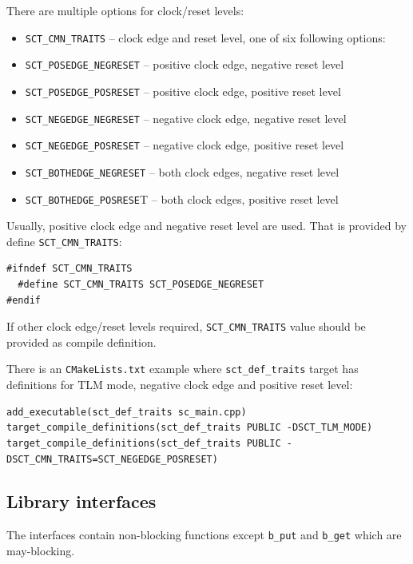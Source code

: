 There are multiple options for clock/reset levels:

\begin{itemize}
\item {\tt SCT\_CMN\_TRAITS} -- clock edge and reset level, one of six following options:
\item {\tt SCT\_POSEDGE\_NEGRESET} -- positive clock edge, negative reset level
\item {\tt SCT\_POSEDGE\_POSRESET} -- positive clock edge, positive reset level
\item {\tt SCT\_NEGEDGE\_NEGRESET} -- negative clock edge, negative reset level
\item {\tt SCT\_NEGEDGE\_POSRESET} -- negative clock edge, positive reset level
\item {\tt SCT\_BOTHEDGE\_NEGRESET} -- both clock edges, negative reset level
\item {\tt SCT\_BOTHEDGE\_POSRESE}T -- both clock edges, positive reset level
\end{itemize}

Usually, positive clock edge and negative reset level are used. That is provided by define {\tt  SCT\_CMN\_TRAITS}:
\begin{lstlisting}[style=mycpp]
#ifndef SCT_CMN_TRAITS
  #define SCT_CMN_TRAITS SCT_POSEDGE_NEGRESET
#endif
\end{lstlisting}

If other clock edge/reset levels required, {\tt SCT\_CMN\_TRAITS} value should be provided as compile definition.

There is an {\tt CMakeLists.txt} example where {\tt sct\_def\_traits} target has definitions for TLM mode, negative clock edge and positive reset level:
\begin{lstlisting}[style=mycmake]
add_executable(sct_def_traits sc_main.cpp)
target_compile_definitions(sct_def_traits PUBLIC -DSCT_TLM_MODE)
target_compile_definitions(sct_def_traits PUBLIC -DSCT_CMN_TRAITS=SCT_NEGEDGE_POSRESET)
\end{lstlisting}


\subsection{Library interfaces}\label{section:sct_interfaces}

The interfaces contain non-blocking functions except {\tt b\_put} and {\tt b\_get} which are may-blocking.

